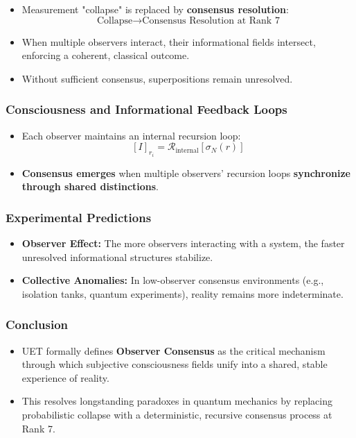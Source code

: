 \documentclass[12pt,a4paper]{article}
\begin{document}
\begin{itemize}
    \item Measurement "collapse" is replaced by \textbf{consensus resolution}:
    \[
    \text{Collapse} \rightarrow \text{Consensus Resolution at Rank 7}
    \]
    \item When multiple observers interact, their informational fields intersect, enforcing a coherent, classical outcome.
    \item Without sufficient consensus, superpositions remain unresolved.
\end{itemize}

\subsubsection*{Consciousness and Informational Feedback Loops}

\begin{itemize}
    \item Each observer maintains an internal recursion loop:
    \[
    [I]_{r_i} = \mathcal{R}_{\text{internal}}[\sigma_N(r)]
    \]
    \item \textbf{Consensus emerges} when multiple observers’ recursion loops \textbf{synchronize through shared distinctions}.
\end{itemize}

\subsubsection*{Experimental Predictions}

\begin{itemize}
    \item \textbf{Observer Effect:} The more observers interacting with a system, the faster unresolved informational structures stabilize.
    \item \textbf{Collective Anomalies:} In low-observer consensus environments (e.g., isolation tanks, quantum experiments), reality remains more indeterminate.
\end{itemize}

\subsubsection*{Conclusion}

\begin{itemize}
    \item UET formally defines \textbf{Observer Consensus} as the critical mechanism through which subjective consciousness fields unify into a shared, stable experience of reality.
    \item This resolves longstanding paradoxes in quantum mechanics by replacing probabilistic collapse with a deterministic, recursive consensus process at Rank 7.
\end{itemize}
\end{document}
